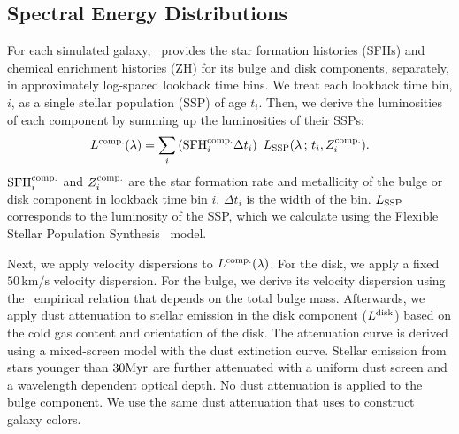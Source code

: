 
\subsection{Spectral Energy Distributions} \label{sec:sed}
For each simulated galaxy, \lgal~provides the star formation histories (SFHs)
and chemical enrichment histories (ZH) for its bulge and disk components,
separately, in approximately log-spaced lookback time bins.  
We treat each lookback time bin, $i$, as a single stellar population (SSP) of
age $t_i$.
Then, we derive the luminosities of each component by summing up the
luminosities of their SSPs:
\begin{equation}
    L^{\rm comp.}(\lambda) = \sum \limits_i \left({\rm SFH}^{\rm comp.}_i
    \Delta t_i\right)~L_{\rm SSP}(\lambda\,;\, t_i, Z^{\rm comp.}_i). 
\end{equation}
${\rm SFH}^{\rm comp.}_i$ and $Z^{\rm comp.}_i$ are the star formation rate and
metallicity of the bulge or disk component in lookback time bin $i$. 
$\Delta t_i$ is the width of the bin. 
$L_{\rm SSP}$ corresponds to the luminosity of the SSP, which we calculate
using the Flexible Stellar Population Synthesis~\citep[\fsps;][]{conroy2009,
conroy2010c} model.

Next, we apply velocity dispersions to $L^{\rm comp.}(\lambda)$.
For the disk, we apply a fixed $50\,\mathrm{km/s}$ velocity dispersion. 
For the bulge, we derive its velocity dispersion using the~\cite{zahid2016}
empirical relation that depends on the total bulge mass.
Afterwards, we apply dust attenuation to stellar emission in the disk component
($L^{\rm disk}$) based on the cold gas content and orientation of the disk. 
The attenuation curve is derived using a mixed-screen model with the
\cite{mathis1983} dust extinction curve. 
Stellar emission from stars younger than $30{\rm Myr}$ are further attenuated
with a uniform dust screen and a wavelength dependent optical depth.
No dust attenuation is applied to the bulge component.
We use the same dust attenuation that \cite{henriques2015} uses to construct
galaxy colors. 

